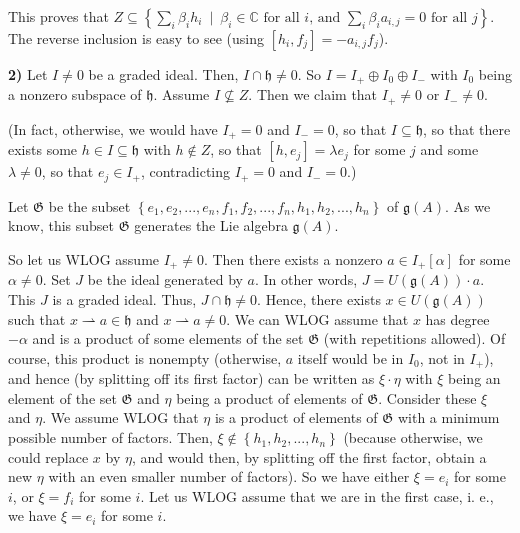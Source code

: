 \documentclass[etingof-lie.tex]{subfiles}
\begin{document}
This proves that $Z\subseteq\left\{  \sum\limits_{i}\beta_{i}h_{i}%
\ \mid\ \beta_{i}\in\mathbb{C}\text{ for all }i\text{, and }\sum
\limits_{i}\beta_{i}a_{i,j}=0\text{ for all }j\right\}  $. The reverse
inclusion is easy to see (using $\left[  h_{i},f_{j}\right]  =-a_{i,j}f_{j}$).

\textbf{2)} Let $I\neq0$ be a graded ideal. Then, $I\cap\mathfrak{h}\neq0$. So
$I=I_{+}\oplus I_{0}\oplus I_{-}$ with $I_{0}$ being a nonzero subspace of
$\mathfrak{h}$. Assume $I\not \subseteq Z$. Then we claim that $I_{+}\neq0$ or
$I_{-}\neq0$.

(In fact, otherwise, we would have $I_{+}=0$ and $I_{-}=0$, so that
$I\subseteq\mathfrak{h}$, so that there exists some $h\in I\subseteq
\mathfrak{h}$ with $h\notin Z$, so that $\left[  h,e_{j}\right]  =\lambda
e_{j}$ for some $j$ and some $\lambda\neq0$, so that $e_{j}\in I_{+}$,
contradicting $I_{+}=0$ and $I_{-}=0$.)

Let $\mathfrak{G}$ be the subset $\left\{  e_{1},e_{2},...,e_{n},f_{1}%
,f_{2},...,f_{n},h_{1},h_{2},...,h_{n}\right\}  $ of $\mathfrak{g}\left(
A\right)  $. As we know, this subset $\mathfrak{G}$ generates the Lie algebra
$\mathfrak{g}\left(  A\right)  $.

So let us WLOG assume $I_{+}\neq0$. Then there exists a nonzero $a\in
I_{+}\left[  \alpha\right]  $ for some $\alpha\neq0$. Set $J$ be the ideal
generated by $a$. In other words, $J=U\left(  \mathfrak{g}\left(  A\right)
\right)  \cdot a$. This $J$ is a graded ideal. Thus, $J\cap\mathfrak{h}\neq0$.
Hence, there exists $x\in U\left(  \mathfrak{g}\left(  A\right)  \right)  $
such that $x\rightharpoonup a\in\mathfrak{h}$ and $x\rightharpoonup a\neq0$.
We can WLOG assume that $x$ has degree $-\alpha$ and is a product of some
elements of the set $\mathfrak{G}$ (with repetitions allowed). Of course, this
product is nonempty (otherwise, $a$ itself would be in $I_{0}$, not in $I_{+}%
$), and hence (by splitting off its first factor) can be written as $\xi
\cdot\eta$ with $\xi$ being an element of the set $\mathfrak{G}$ and $\eta$
being a product of elements of $\mathfrak{G}$. Consider these $\xi$ and $\eta
$. We assume WLOG that $\eta$ is a product of elements of $\mathfrak{G}$ with
a minimum possible number of factors. Then, $\xi\notin\left\{  h_{1}%
,h_{2},...,h_{n}\right\}  $ (because otherwise, we could replace $x$ by $\eta
$, and would then, by splitting off the first factor, obtain a new $\eta$ with
an even smaller number of factors). So we have either $\xi=e_{i}$ for some
$i$, or $\xi=f_{i}$ for some $i$. Let us WLOG assume that we are in the first
case, i. e., we have $\xi=e_{i}$ for some $i$.
\end{document}
